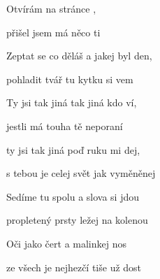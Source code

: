 

\zs
Otvírám  na stránce ,

přišel jsem  má něco ti 

Zeptat se co děláš a jakej byl den,

pohladit tvář tu kytku si vem
\ks

\zr
Ty jsi tak jiná tak jiná kdo ví,

jestli má touha tě neporaní

ty jsi tak jiná poď ruku mi dej,

s tebou je celej svět jak vyměněnej
\kr

\zs
Sedíme tu spolu a slova si jdou

propletený prsty ležej na kolenou

Oči jako čert a malinkej nos

ze všech je nejhezčí tiše už dost
\ks

\zr
\kr

\kp





